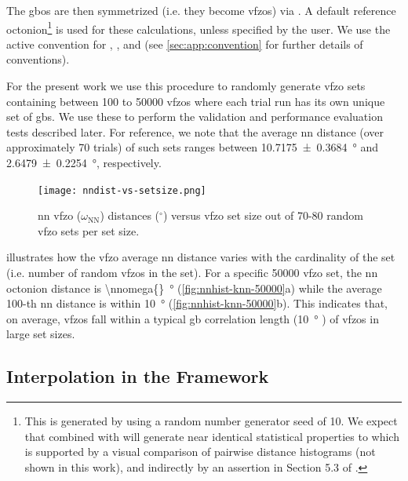 \documentclass[final,twocolumn,12pt]{elsarticle}
\begin{document}
The \glspl{gbo} are then symmetrized (i.e. they become \glspl{vfzo}) via . A default reference octonion\footnote{This is generated by  using a random number generator seed of 10. We expect that  combined with  will generate near identical statistical properties to  which is supported by a visual comparison of pairwise distance histograms (not shown in this work), and indirectly by an assertion in Section 5.3 of \citet{morawiecDistancesGrainInterfaces2019}. } is used for these calculations, unless specified by the user. We use the active convention for , , and  (see \cref{sec:app:convention} for further details of conventions).

For the present work we use this procedure to randomly generate \gls{vfzo} sets containing between \num{100} to \num{50000} \glspl{vfzo} where each trial run has its own unique set of \glspl{gb}. We use these to perform the validation and performance evaluation tests described later. For reference, we note that the average \gls{nn} distance (over approximately 70 trials) of such sets ranges between \SI{10.7175 \pm 0.3684}{\degree} and \SI{2.6479 \pm 0.2254}{\degree}, respectively. 
\begin{figure}
    \centering
    \texttt{[image: nndist-vs-setsize.png]}
    \caption{\Gls{nn} \gls{vfzo} ($\omega_{\text{NN}}$) distances ($^{\circ}$) versus \gls{vfzo} set size out of 70-80 random \gls{vfzo} sets per set size.}
    \label{fig:nndist-vs-setsize}
\end{figure}

 illustrates how the \gls{vfzo} average \gls{nn} distance varies with the cardinality of the set (i.e. number of random \glspl{vfzo} in the set). For a specific \num{50000} \gls{vfzo} set, the \gls{nn} octonion distance is \SI{\nnomega{}}{\degree} (\cref{fig:nnhist-knn-50000}a) while the average 100-th \gls{nn} distance is within \SI{10}{\degree} (\cref{fig:nnhist-knn-50000}b). This indicates that, on average, \outpt{} \glspl{vfzo} fall within a typical \gls{gb} correlation length (\SI{10}{\degree} \cite{olmstedSurveyComputedGrain2009}) of \inpt{} \glspl{vfzo} in large set sizes.

\subsection{Interpolation in the  Framework}
\label{sec:methods:interp}
\end{document}
